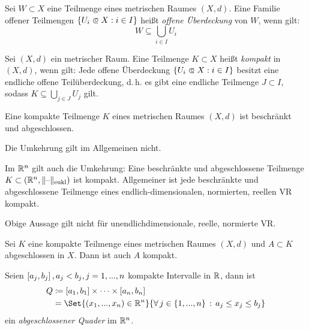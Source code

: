 \documentclass{cheat-sheet}
\begin{document}
\begin{defn}
  Sei $W \subset X$ eine Teilmenge eines metrischen Raumes $(X, d)$. Eine Familie offener Teilmengen $\{ U_i \opn X : i \in I \}$ heißt \emph{offene Überdeckung} von $W$, wenn gilt:
  \[ W \subseteq \bigcup_{i \in I} U_i \]
\end{defn}

\begin{defn}
  Sei $(X, d)$ ein metrischer Raum. Eine Teilmenge $K \subset X$ heißt \emph{kompakt} in $(X, d)$, wenn gilt: Jede offene Überdeckung $\{ U_i \opn X : i \in I \}$ besitzt eine endliche offene Teilüberdeckung, d.\,h. es gibt eine endliche Teilmenge $J \subset I$, sodass $K \subseteq \bigcup_{j \in J} U_j$ gilt.
\end{defn}


\begin{satz}
Eine kompakte Teilmenge $K$ eines metrischen Raumes $(X, d)$ ist beschränkt und abgeschlossen.
\end{satz}

\begin{acht}
Die Umkehrung gilt im Allgemeinen nicht.
\end{acht}

\begin{satz}
Im $\mathbb{R}^n$ gilt auch die Umkehrung: Eine beschränkte und abgeschlossene Teilmenge $K \subset (\mathbb{R}^n, \lVert\text{--}\rVert_\text{eukl})$ ist kompakt. Allgemeiner ist jede beschränkte und abgeschlossene Teilmenge eines endlich-dimensionalen, normierten, reellen VR kompakt.
\end{satz}

\begin{acht}
Obige Aussage gilt nicht für unendlichdimensionale, reelle, normierte VR.
\end{acht}


\begin{satz}
Sei $K$ eine kompakte Teilmenge eines metrischen Raumes $(X, d)$ und $A \subset K$ abgeschlossen in $X$. Dann ist auch $A$ kompakt.
\end{satz}

\begin{defn}
Seien $\left[ a_j, b_j \right], a_j < b_j, j = 1, ..., n$ kompakte Intervalle in $\mathbb{R}$, dann ist
\begin{align*}
  Q &\coloneqq \cinterval{a_1}{b_1} \times \cdots \times \cinterval{a_n}{b_n}\\
  &= \Set{ (x_1, ..., x_n) \in \R^n }{ \fa{j \in \{ 1, ..., n \}} a_j \le x_j \le b_j }
\end{align*}
ein \emph{abgeschlossener Quader} im $\mathbb{R}^n$.
\end{defn}
\end{document}
